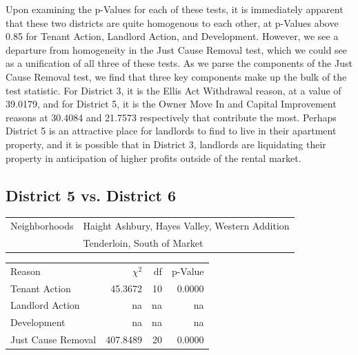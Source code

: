\documentclass[]{article}
\begin{document}
Upon examining the p-Values for each of these tests, it is immediately apparent that these two districts are quite homogenous to each other, at p-Values above 0.85 for Tenant Action, Landlord Action, and Development. However, we see a departure from homogeneity in the Just Cause Removal test, which we could see as a unification of all three of these tests.
\newline\newline
As we parse the components of the Just Cause Removal test, we find that three key components make up the bulk of the test statistic. For District 3, it is the Ellis Act Withdrawal reason, at a value of 39.0179, and for District 5, it is the Owner Move In and Capital Improvement reasons at 30.4084 and 21.7573 respectively that contribute the most. Perhaps District 5 is an attractive place for landlords to find to live in their apartment property, and it is possible that in District 3, landlords are liquidating their property in anticipation of higher profits outside of the rental market.

\subsection{District 5 vs. District 6}
\begin{table}[!h]
\centering
\begin{tabular}{l | l}
Neighborhoods & Haight Ashbury, Hayes Valley, Western Addition\\
			  & Tenderloin, South of Market  \\ 
\end{tabular}
\end{table}

\begin {table}[!h]
\centering
\begin{tabular}{l | r | r | r}	
Reason				 &  $\chi ^{2}$ & df    & p-Value   \\
Tenant Action 		 &  45.3672     & 10    & 0.0000    \\
Landlord Action	     &  na          & na    & na        \\
Development			 &  na          & na    & na        \\
Just Cause Removal	 &  407.8489    & 20    & 0.0000    \\
\end{tabular} \newline
\end{table}
\end{document}
